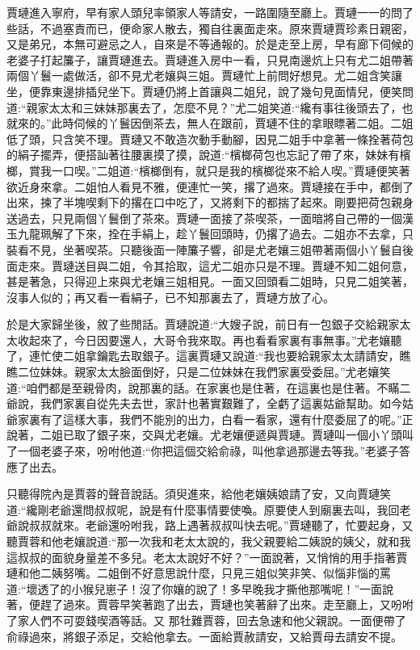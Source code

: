 \begin{parag}
    賈璉進入寧府，早有家人頭兒率領家人等請安，一路圍隨至廳上。賈璉一一的問了些話，不過塞責而已，便命家人散去，獨自往裏面走來。原來賈璉賈珍素日親密，又是弟兄，本無可避忌之人，自來是不等通報的。於是走至上房，早有廊下伺候的老婆子打起簾子，讓賈璉進去。賈璉進入房中一看，只見南邊炕上只有尤二姐帶著兩個丫鬟一處做活，卻不見尤老孃與三姐。賈璉忙上前問好想見。尤二姐含笑讓坐，便靠東邊排插兒坐下。賈璉仍將上首讓與二姐兒，說了幾句見面情兒，便笑問道:“親家太太和三妹妹那裏去了，怎麼不見？”尤二姐笑道:“纔有事往後頭去了，也就來的。”此時伺候的丫鬟因倒茶去，無人在跟前，賈璉不住的拿眼瞟著二姐。二姐低了頭，只含笑不理。賈璉又不敢造次動手動腳，因見二姐手中拿著一條拴著荷包的絹子擺弄，便搭訕著往腰裏摸了摸，說道:“檳榔荷包也忘記了帶了來，妹妹有檳榔，賞我一口喫。”二姐道:“檳榔倒有，就只是我的檳榔從來不給人喫。”賈璉便笑著欲近身來拿。二姐怕人看見不雅，便連忙一笑，撂了過來。賈璉接在手中，都倒了出來，揀了半塊喫剩下的撂在口中吃了，又將剩下的都揣了起來。剛要把荷包親身送過去，只見兩個丫鬟倒了茶來。賈璉一面接了茶喫茶，一面暗將自己帶的一個漢玉九龍珮解了下來，拴在手絹上，趁丫鬟回頭時，仍撂了過去。二姐亦不去拿，只裝看不見，坐著喫茶。只聽後面一陣簾子響，卻是尤老孃三姐帶著兩個小丫鬟自後面走來。賈璉送目與二姐，令其拾取，這尤二姐亦只是不理。賈璉不知二姐何意，甚是著急，只得迎上來與尤老孃三姐相見。一面又回頭看二姐時，只見二姐笑著，沒事人似的；再又看一看絹子，已不知那裏去了，賈璉方放了心。
\end{parag}


\begin{parag}
    於是大家歸坐後，敘了些閒話。賈璉說道:“大嫂子說，前日有一包銀子交給親家太太收起來了，今日因要還人，大哥令我來取。再也看看家裏有事無事。”尤老孃聽了，連忙使二姐拿鑰匙去取銀子。這裏賈璉又說道:“我也要給親家太太請請安，瞧瞧二位妹妹。親家太太臉面倒好，只是二位妹妹在我們家裏受委屈。”尤老孃笑道:“咱們都是至親骨肉，說那裏的話。在家裏也是住著，在這裏也是住著。不瞞二爺說，我們家裏自從先夫去世，家計也著實艱難了，全虧了這裏姑爺幫助。如今姑爺家裏有了這樣大事，我們不能別的出力，白看一看家，還有什麼委屈了的呢。”正說著，二姐已取了銀子來，交與尤老孃。尤老孃便遞與賈璉。賈璉叫一個小丫頭叫了一個老婆子來，吩咐他道:“你把這個交給俞祿，叫他拿過那邊去等我。”老婆子答應了出去。
\end{parag}


\begin{parag}
    只聽得院內是賈蓉的聲音說話。須臾進來，給他老孃姨娘請了安，又向賈璉笑道:“纔剛老爺還問叔叔呢，說是有什麼事情要使喚。原要使人到廟裏去叫，我回老爺說叔叔就來。老爺還吩咐我，路上遇著叔叔叫快去呢。”賈璉聽了，忙要起身，又聽賈蓉和他老孃說道:“那一次我和老太太說的，我父親要給二姨說的姨父，就和我這叔叔的面貌身量差不多兒。老太太說好不好？”一面說著，又悄悄的用手指著賈璉和他二姨努嘴。二姐倒不好意思說什麼，只見三姐似笑非笑、似惱非惱的罵道:“壞透了的小猴兒崽子！沒了你孃的說了！多早晚我才撕他那嘴呢！”一面說著，便趕了過來。賈蓉早笑著跑了出去，賈璉也笑著辭了出來。走至廳上，又吩咐了家人們不可耍錢喫酒等話。又 那牡難賈蓉，回去急速和他父親說。一面便帶了俞祿過來，將銀子添足，交給他拿去。一面給賈赦請安，又給賈母去請安不提。
\end{parag}


